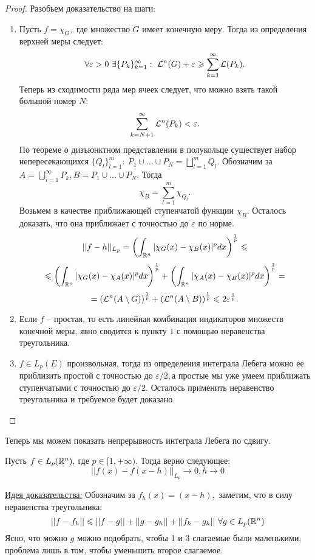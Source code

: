 \begin{proof} Разобьем доказательство на шаги:

\begin{enumerate}
    \item Пусть $f = \chi_{G},$ где множество $G$ имеет конечную меру. Тогда из определения верхней меры следует:
    $$\forall \varepsilon > 0 \ \exists \{P_{k}\}_{k = 1}^{\infty} : \ \mathcal{L}^n(G) + \varepsilon \geqslant \sum_{k  =1}^{\infty}\mathcal{L}(P_k).$$
    Теперь из сходимости ряда мер ячеек следует, что можно взять такой большой номер $N:$
    $$\sum_{k = N + 1}^{\infty} \mathcal{L}^n(P_k) < \varepsilon.$$
    По теореме о дизъюнктном представлении в полукольце существует набор непересекающихся $\{Q_l\}_{l = 1}^{m}: \ P_1 \cup \ldots \cup P_N = \bigsqcup_{l = 1}^mQ_l.$ Обозначим за $A = \bigcup_{i = 1}^{\infty} P_k,  B = P_1 \cup \ldots \cup P_N.$ Тогда  
    $$\chi_{B} = \sum_{l = 1}^{m}\chi_{Q_l}.$$
    Возьмем в качестве приближающей ступенчатой функции $\chi_{B}.$ Осталось доказать, что она приближает с точностью до $\varepsilon$ по норме.
    $$||f - h||_{L_p} = \left( \int_{\mathbb{R}^n} |\chi_G(x) - \chi_B(x)|^p dx\right)^{\frac{1}{p}} \leqslant$$
    $$\leqslant \left( \int_{\mathbb{R}^n} |\chi_G(x) - \chi_A(x)|^p dx\right)^{\frac{1}{p}} + \left( \int_{\mathbb{R}^n} |\chi_A(x) - \chi_B(x)|^p dx\right)^{\frac{1}{p}} = $$
    $$= \left( \mathcal{L}^n(A \setminus G)\right)^{\frac{1}{p}} + \left( \mathcal{L}^n(A \setminus B) \right)^{\frac{1}{p}} \leqslant 2\varepsilon^{\frac{1}{p}}.$$ 
    \item Если $f$ -- простая, то есть линейная комбинация индикаторов множеств конечной меры, явно сводится к пункту $1$ с помощью неравенства треугольника.
    \item $f \in L_p(E)$ произвольная, тогда из определения интеграла Лебега можно ее приблизить простой с точностью до $\varepsilon / 2, $а простые мы уже умеем приближать ступенчатыми с точностью до $\varepsilon / 2.$ Осталось применить неравенство треугольника и требуемое будет доказано.
\end{enumerate}
\end{proof}

Теперь мы можем показать непрерывность интеграла Лебега по сдвигу.
\begin{theorem}
    Пусть $f \in L_p(\mathbb{R}^n), $ где $p \in [1, +\infty).$ Тогда верно следующее:
    $$||f(x) - f(x - h)||_{L_p} \rightarrow 0, h \rightarrow 0$$
\end{theorem}

\underline{Идея доказательства:} Обозначим за $f_h(x) = (x - h),$ заметим, что в силу неравенства треугольника:
$$||f - f_h|| \leqslant ||f - g|| + ||g - g_h|| + ||f_h - g_h|| \ \forall g \in L_p(\mathbb{R}^n)$$
Ясно, что можно $g$ можно подобрать, чтобы 1 и 3 слагаемые были маленькими, проблема лишь в том, чтобы уменьшить второе слагаемое.  

